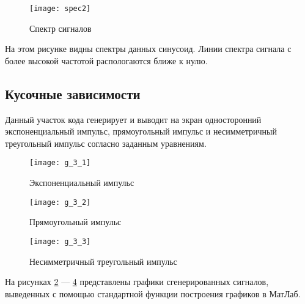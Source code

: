 \begin{figure}[H]
	\begin{center}
		\texttt{[image: spec2]}
		\caption{Спектр сигналов} 
		\label{pic:spec2} %
	\end{center}
\end{figure}
На этом рисунке видны спектры данных синусоид. Линии спектра сигнала с более высокой частотой распологаются ближе к нулю.

\subsection{Кусочные зависимости}


\parindent=1cm
Данный участок кода генерирует и выводит на экран односторонний экспоненциальный импульс, прямоугольный импульс и несимметричный треугольный импульс согласно заданным уравнениям.

\begin{figure}[H]
	\begin{center}
		\texttt{[image: g\_3\_1]}
		\caption{Экспоненциальный импульс} 
		\label{pic:g_3_1} %
	\end{center}
\end{figure}
\begin{figure}[H]
	\begin{center}
		\texttt{[image: g\_3\_2]}
		\caption{Прямоугольный импульс} 
		\label{pic:g_3_2} %
	\end{center}
\end{figure}
\begin{figure}[H]
	\begin{center}
		\texttt{[image: g\_3\_3]}
		\caption{Несимметричный треугольный импульс} 
		\label{pic:g_3_3} %
	\end{center}
\end{figure}
На рисунках  \ref{pic:g_3_1} — \ref{pic:g_3_3} представлены графики сгенерированных сигналов, выведенных с помощью стандартной функции построения графиков в МатЛаб.

